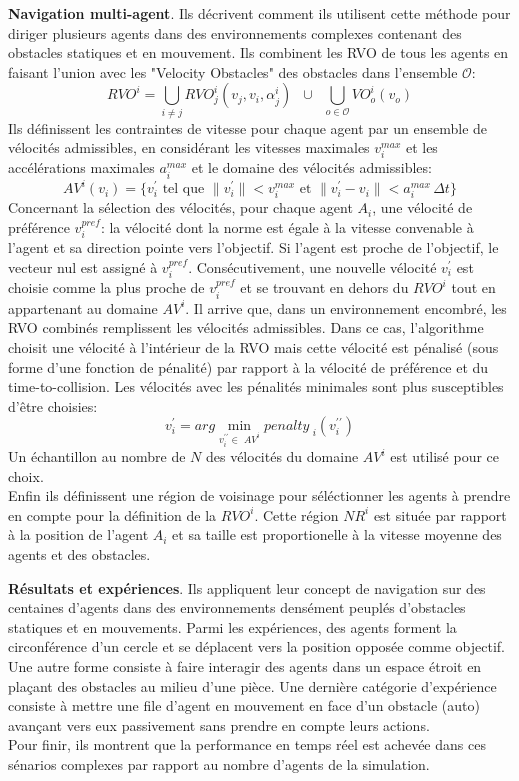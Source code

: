 \documentclass[11pt]{article}
\begin{document}
\textbf{Navigation multi-agent}. Ils décrivent comment ils utilisent cette méthode pour diriger plusieurs agents dans des environnements complexes contenant des obstacles statiques et en mouvement. Ils combinent les RVO de tous les agents en faisant l'union avec les "Velocity Obstacles" des obstacles dans l'ensemble $\mathcal{O}$:
\[
RVO^i = \bigcup_{i \neq j} RVO_j^i(v_j, v_i, \alpha_j^i) \;\;\cup\;\; \bigcup_{o \in \mathcal{O}} VO_o^i(v_o)
\]
Ils définissent les contraintes de vitesse pour chaque agent par un ensemble de vélocités admissibles, en considérant les vitesses maximales $v_i^{max}$ et les accélérations maximales $a_i^{max}$ et le domaine des vélocités admissibles:
\[
AV^i(v_i) = \{ v_i^\prime \mbox{ tel que } \| v_i^\prime \| < v_i^{max} \mbox{ et } \| v_i^\prime - v_i \| < a_i^{max} \,\Delta t \}
\]
Concernant la sélection des vélocités, pour chaque agent $A_i$, une vélocité de préférence $v_i^{pref}$: la vélocité dont la norme est égale à la vitesse convenable à l'agent et sa direction pointe vers l'objectif. Si l'agent est proche de l'objectif, le vecteur nul est assigné à $v_i^{pref}$. Consécutivement, une nouvelle vélocité $v_i^\prime$ est choisie comme la plus proche de $v_i^{pref}$ et se trouvant en dehors du $RVO^i$ tout en appartenant au domaine $AV^i$. Il arrive que, dans un environnement encombré, les RVO combinés remplissent les vélocités admissibles. Dans ce cas, l'algorithme choisit une vélocité à l'intérieur de la RVO mais cette vélocité est pénalisé (sous forme d'une fonction de pénalité) par rapport à la vélocité de préférence et du time-to-collision. Les vélocités avec les pénalités minimales sont plus susceptibles d'être choisies:
\[
v_i^\prime = arg\!\!\!\!\min_{\scriptscriptstyle{v_i^{\prime\prime} \in\,\, AV^i}} penalty_{\,\,i}(v_i^{\prime\prime})
\]
Un échantillon au nombre de $N$ des vélocités du domaine $AV^i$ est utilisé pour ce choix.\\
Enfin ils définissent une région de voisinage pour séléctionner les agents à prendre en compte pour la définition de la $RVO^i$. Cette région $NR^i$ est située par rapport à la position de l'agent $A_i$ et sa taille est proportionelle à la vitesse moyenne des agents et des obstacles. 

\textbf{Résultats et expériences}. Ils appliquent leur concept de navigation sur des centaines d'agents dans des environnements densément peuplés d'obstacles statiques et en mouvements. Parmi les expériences, des agents forment la circonférence d'un cercle et se déplacent vers la position opposée comme objectif. Une autre forme consiste à faire interagir des agents dans un espace étroit en plaçant des obstacles au milieu d'une pièce. Une dernière catégorie d'expérience consiste à mettre une file d'agent en mouvement en face d'un obstacle (auto) avançant vers eux passivement sans prendre en compte leurs actions.\\
Pour finir, ils montrent que la performance en temps réel est achevée dans ces sénarios complexes par rapport au nombre d'agents de la simulation.
\end{document}
